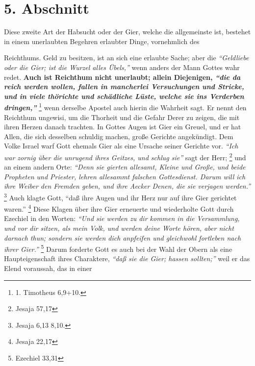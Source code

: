 \section{5. Abschnitt} \label{kap13_ab5} 

Diese zweite Art der Habsucht oder der Gier, welche die allgemeinste ist,
bestehet in einem unerlaubten Begehren erlaubter Dinge, vornehmlich des

 Reichthums. Geld zu besitzen, ist an sich eine erlaubte Sache; aber die
\textit{"`Geldliebe oder die Gier; ist die Wurzel alles Übels,"'} wenn anders der Mann
Gottes wahr redet. \textbf{Auch ist Reichthum nicht unerlaubt; allein Diejenigen,
\textit{"`die da reich werden wollen, fallen in mancherlei Versuchungen und Stricke, und in
viele thörichte und schädliche Lüste, welche sie ins Verderben
dringen,"'}}
\footnote{1. Timotheus 6,9+10.}
wenn derselbe Apostel auch hierin die
Wahrheit sagt. Er nennt den Reichthum ungewisi, um die Thorheit und die Gefahr
Derer zu zeigen, die mit ihren Herzen danach trachten. In Gottes Augen ist
Gier ein Greuel, und er hat Allen, die sich desselben schuldig machen, große
Gerichte angekündigt. Dem Volke Israel warf Gott ehemals Gier als eine
Ursache seiner Gerichte vor.
\textit{"`Ich war zornig über die unrugend ihres Geitzes,
und schlug sie"'} sagt der Herr;
\footnote{Jesaja 57,17}
und an einem andern Orte:
\textit{"`Denn sie gierten allesamt, Kleine und Große, und beide Propheten und
Priester, lehren allesammt falschen Gottesdienst. Darum will ich ihre Weiber den
Fremden geben, und ihre Aecker Denen, die sie verjagen werden."'}
\footnote{Jesaja 6,13 8,10.}
Auch klagte Gott,
"`daß ihre Augen und ihr Herz nur auf ihre Gier
gerichtet waren."'
\footnote{Jesaja 22,17}
Diese Klagen über ihre Gier erneuerte
und wiederholte Gott durch Ezechiel in den Worten:
\textit{"`Und sie werden zu dir
kommen in die Versammlung, und vor dir sitzen, als mein Volk, und werden deine
Worte hören, aber nicht darnach thun; sondern sie werden dich anpfeifen und
gleichwohl fortleben nach ihrer Gier."'}
\footnote{Ezechiel 33,31}
Darum forderte
Gott es auch bei der Wahl der Obern als eine Haupteigenschaft ihres Charaktere,
\textit{"`daß sie die Gier; hassen sollten;"'} weil er das Elend voraussah, das in einer
